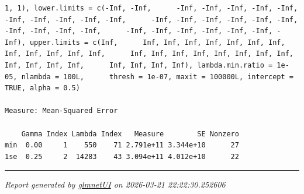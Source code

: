 \documentclass[
]{article}
\begin{document}
\begin{verbatim}
1, 1), lower.limits = c(-Inf, -Inf,      -Inf, -Inf, -Inf, -Inf, -Inf, -Inf, -Inf, -Inf, -Inf, -Inf,      -Inf, -Inf, -Inf, -Inf, -Inf, -Inf, -Inf, -Inf, -Inf, -Inf,      -Inf, -Inf, -Inf, -Inf, -Inf, -Inf, -Inf), upper.limits = c(Inf,      Inf, Inf, Inf, Inf, Inf, Inf, Inf, Inf, Inf, Inf, Inf, Inf,      Inf, Inf, Inf, Inf, Inf, Inf, Inf, Inf, Inf, Inf, Inf, Inf,      Inf, Inf, Inf, Inf), lambda.min.ratio = 1e-05, nlambda = 100L,      thresh = 1e-07, maxit = 100000L, intercept = TRUE, alpha = 0.5) 

Measure: Mean-Squared Error 

    Gamma Index Lambda Index   Measure        SE Nonzero
min  0.00     1    550    71 2.791e+11 3.344e+10      27
1se  0.25     2  14283    43 3.094e+11 4.012e+10      22
\end{verbatim}

\begin{center}\rule{0.5\linewidth}{0.5pt}\end{center}

\emph{Report generated by
\href{https://github.com/wcraytor/glmnetUI}{glmnetUI} on 2026-03-21
22:22:30.252606}
\end{document}
